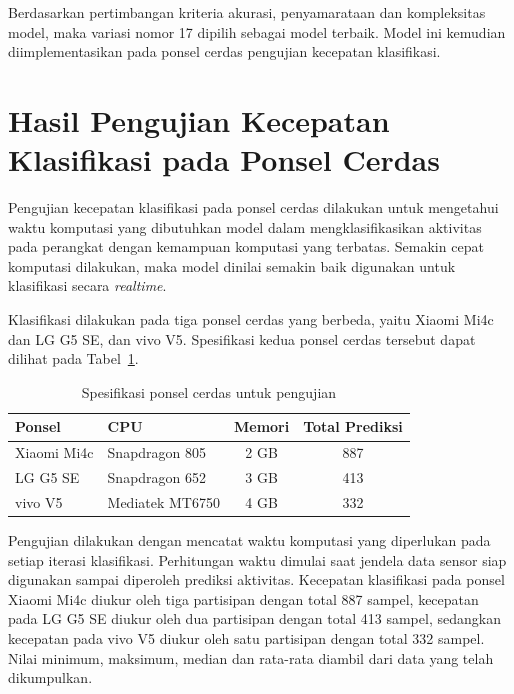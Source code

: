 Berdasarkan pertimbangan kriteria akurasi, penyamarataan dan kompleksitas model, maka variasi nomor 17 dipilih sebagai model terbaik. Model ini kemudian diimplementasikan pada ponsel cerdas pengujian kecepatan klasifikasi.

\section{Hasil Pengujian Kecepatan Klasifikasi pada Ponsel Cerdas}

Pengujian kecepatan klasifikasi pada ponsel cerdas dilakukan untuk mengetahui waktu komputasi yang dibutuhkan model dalam mengklasifikasikan aktivitas pada perangkat dengan kemampuan komputasi yang terbatas. Semakin cepat komputasi dilakukan, maka model dinilai semakin baik digunakan untuk klasifikasi secara \textit{realtime}.

Klasifikasi dilakukan pada tiga ponsel cerdas yang berbeda, yaitu Xiaomi Mi4c dan LG G5 SE, dan vivo V5. Spesifikasi kedua ponsel cerdas tersebut dapat dilihat pada Tabel~\ref{table:spesifikasi-ponsel-cerdas}.

\begin{table}[h!]
    \centering
    \caption{Spesifikasi ponsel cerdas untuk pengujian}
    \begin{tabular}{ |l|l|c|c| }
        \hline
        Ponsel & CPU & Memori & Total Prediksi \\

        \hline
        Xiaomi Mi4c & Snapdragon 805 & 2 GB & 887 \\

        \hline
        LG G5 SE & Snapdragon 652 & 3 GB & 413 \\

        \hline
        vivo V5 & Mediatek MT6750 & 4 GB & 332 \\

        \hline
    \end{tabular}
    \label{table:spesifikasi-ponsel-cerdas}
\end{table}

Pengujian dilakukan dengan mencatat waktu komputasi yang diperlukan pada setiap iterasi klasifikasi. Perhitungan waktu dimulai saat jendela data sensor siap digunakan sampai diperoleh prediksi aktivitas. Kecepatan klasifikasi pada ponsel Xiaomi Mi4c diukur oleh tiga partisipan dengan total 887 sampel, kecepatan pada LG G5 SE diukur oleh dua partisipan dengan total 413 sampel, sedangkan kecepatan pada vivo V5 diukur oleh satu partisipan dengan total 332 sampel. Nilai minimum, maksimum, median dan rata-rata diambil dari data yang telah dikumpulkan.

